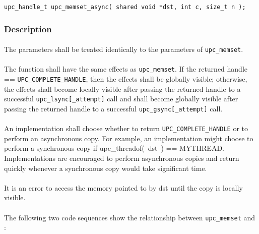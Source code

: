 \documentclass[10pt]{article}
\def \memset  {{\tt upc\_memset}}
\def \gsync  {{\tt upc\_gsync[\_attempt]}}
\def \lsync  {{\tt upc\_lsync[\_attempt]}}
\def \complete {{\tt UPC\_COMPLETE\_HANDLE}}
\begin{document}
\begin{verbatim}
upc_handle_t upc_memset_async( shared void *dst, int c, size_t n );
\end{verbatim}

\subsubsection{Description}

\paragraph{} The parameters shall be treated identically to the parameters of
\memset{}.

\paragraph{} The \function{} function shall have the same effects as \memset{}.
If the returned handle == \complete{}, then the effects shall be globally
visible; otherwise, the effects shall become locally visible after passing the
returned handle to a successful \lsync{} call and shall become globally visible
after passing the returned handle to a successful \gsync{} call.

\paragraph{} An implementation shall choose whether to return \complete{} or to
perform an asynchronous copy.  For example, an implementation might choose to
perform a synchronous copy if upc\_threadof(~dst~) == MYTHREAD.  Implementations
are encouraged to perform asynchronous copies and return quickly whenever a
synchronous copy would take significant time.

\paragraph{} It is an error to access the memory pointed to by dst until
the copy is locally visible.

\paragraph{} The following two code sequences show the relationship between
\memset{} and \function{}:
\end{document}
